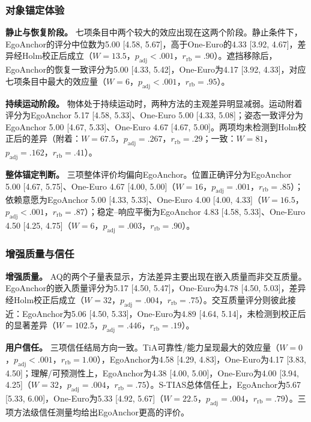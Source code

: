 \documentclass[review]{vgtc}
\begin{document}

\subsubsection{对象锚定体验}

\textbf{静止与恢复阶段。}
七项条目中两个较大的效应出现在这两个阶段。静止条件下，EgoAnchor的评分中位数为5.00 [4.58, 5.67]，高于One-Euro的4.33 [3.92, 4.67]，差异经Holm校正后成立（$W=13.5$，$p_{\mathrm{adj}}<.001$，$r_{\mathrm{rb}}=.90$）。遮挡移除后，EgoAnchor的恢复一致评分为5.00 [4.33, 5.42]，One-Euro为4.17 [3.92, 4.33]，对应七项条目中最大的效应量（$W=6$，$p_{\mathrm{adj}}<.001$，$r_{\mathrm{rb}}=.95$）。

\textbf{持续运动阶段。}
物体处于持续运动时，两种方法的主观差异明显减弱。运动附着评分为EgoAnchor 5.17 [4.58, 5.33]、One-Euro 5.00 [4.33, 5.08]；姿态一致评分为EgoAnchor 5.00 [4.67, 5.33]、One-Euro 4.67 [4.67, 5.00]。两项均未检测到Holm校正后的差异（附着：$W=67.5$，$p_{\mathrm{adj}}=.267$，$r_{\mathrm{rb}}=.29$；一致：$W=81$，$p_{\mathrm{adj}}=.162$，$r_{\mathrm{rb}}=.41$）。

\textbf{整体锚定判断。}
三项整体评价均偏向EgoAnchor。位置正确评分为EgoAnchor 5.00 [4.67, 5.75]、One-Euro 4.67 [4.00, 5.00]（$W=16$，$p_{\mathrm{adj}}=.001$，$r_{\mathrm{rb}}=.85$）；依赖意愿为EgoAnchor 5.00 [4.33, 5.33]、One-Euro 4.00 [4.00, 4.33]（$W=16.5$，$p_{\mathrm{adj}}<.001$，$r_{\mathrm{rb}}=.87$）；稳定--响应平衡为EgoAnchor 4.83 [4.58, 5.33]、One-Euro 4.50 [4.25, 4.75]（$W=6$，$p_{\mathrm{adj}}=.003$，$r_{\mathrm{rb}}=.90$）。

\subsubsection{增强质量与信任}

\textbf{增强质量。}
AQ的两个子量表显示，方法差异主要出现在嵌入质量而非交互质量。EgoAnchor的嵌入质量评分为5.17 [4.50, 5.47]，One-Euro为4.78 [4.50, 5.03]，差异经Holm校正后成立（$W=32$，$p_{\mathrm{adj}}=.004$，$r_{\mathrm{rb}}=.75$）。交互质量评分则彼此接近：EgoAnchor为5.06 [4.50, 5.33]，One-Euro为4.89 [4.64, 5.14]，未检测到校正后的显著差异（$W=102.5$，$p_{\mathrm{adj}}=.446$，$r_{\mathrm{rb}}=.19$）。

\textbf{用户信任。}
三项信任结局方向一致。TiA可靠性/能力呈现最大的效应量（$W=0$，$p_{\mathrm{adj}}<.001$，$r_{\mathrm{rb}}=1.00$），EgoAnchor为4.58 [4.29, 4.83]，One-Euro为4.17 [3.83, 4.50]；理解/可预测性上，EgoAnchor为4.38 [4.00, 5.00]，One-Euro为4.00 [3.94, 4.25]（$W=32$，$p_{\mathrm{adj}}=.004$，$r_{\mathrm{rb}}=.75$）。S-TIAS总体信任上，EgoAnchor为5.67 [5.33, 6.00]，One-Euro为5.33 [4.92, 5.67]（$W=22.5$，$p_{\mathrm{adj}}=.004$，$r_{\mathrm{rb}}=.79$）。三项方法级信任测量均给出EgoAnchor更高的评价。
\end{document}

